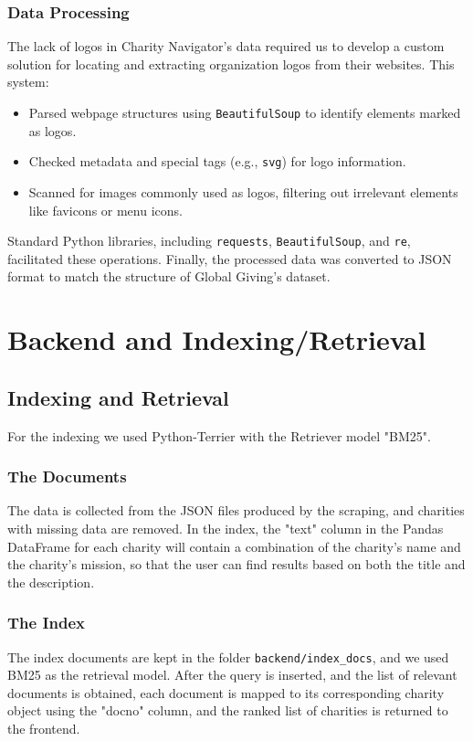 \documentclass[unicode,9pt,a4paper,oneside,numbers=endperiod,openany]{scrartcl}
\begin{document}
\subsubsection{Data Processing}
The lack of logos in Charity Navigator's data required us to develop a custom solution for locating and extracting organization logos from their websites. This system:
\begin{itemize}
\item Parsed webpage structures using \texttt{BeautifulSoup} to identify elements marked as logos.
\item Checked metadata and special tags (e.g., \texttt{svg}) for logo information.
\item Scanned for images commonly used as logos, filtering out irrelevant elements like favicons or menu icons.
\end{itemize}
Standard Python libraries, including \texttt{requests}, \texttt{BeautifulSoup}, and \texttt{re}, facilitated these operations. Finally, the processed data was converted to JSON format to match the structure of Global Giving's dataset.

\section{Backend and Indexing/Retrieval}

\subsection{Indexing and Retrieval}

For the indexing we used Python-Terrier with the Retriever model "BM25".

\subsubsection{The Documents}

The data is collected from the JSON files produced by the scraping, and charities with missing data are removed.
In the index, the "text" column in the Pandas DataFrame for each charity will contain a combination of the charity's name and the charity's mission, so that the user can find results based on both the title and the description.

\subsubsection{The Index}

The index documents are kept in the folder \texttt{backend/index\_docs}, and we used BM25 as the retrieval model. After the query is inserted, and the list of relevant documents is obtained, each document is mapped to its corresponding charity object using the "docno" column, and the ranked list of charities is returned to the frontend.
\end{document}
